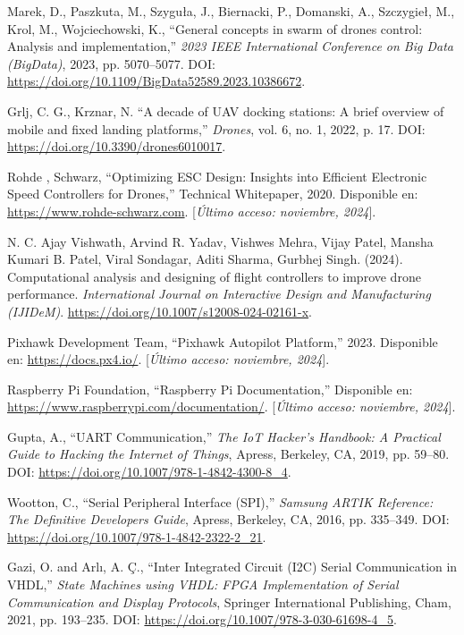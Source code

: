 \begin{thebibliography}{30}
    Marek, D., Paszkuta, M., Szyguła, J., Biernacki, P., Domanski, A., Szczygieł, M., Krol, M., Wojciechowski, K., ``General concepts in swarm of drones control: Analysis and implementation,'' \textit{2023 IEEE International Conference on Big Data (BigData)}, 2023, pp. 5070--5077. DOI: \url{https://doi.org/10.1109/BigData52589.2023.10386672}.



    Grlj, C. G., Krznar, N. ``A decade of UAV docking stations: A brief overview of mobile and fixed landing platforms,'' \textit{Drones}, vol. 6, no. 1, 2022, p. 17. DOI: \url{https://doi.org/10.3390/drones6010017}.

    

    Rohde , Schwarz, ``Optimizing ESC Design: Insights into Efficient Electronic Speed Controllers for Drones,'' Technical Whitepaper, 2020. Disponible en: \url{https://www.rohde-schwarz.com}. [\textit{Último acceso: noviembre, 2024}].

    N. C. Ajay Vishwath, Arvind R. Yadav, Vishwes Mehra, Vijay Patel, Mansha Kumari B. Patel, Viral Sondagar, Aditi Sharma, Gurbhej Singh. (2024). Computational analysis and designing of flight controllers to improve drone performance. \textit{International Journal on Interactive Design and Manufacturing (IJIDeM)}. \url{https://doi.org/10.1007/s12008-024-02161-x}.

    Pixhawk Development Team, ``Pixhawk Autopilot Platform,'' 2023. Disponible en: \url{https://docs.px4.io/}. [\textit{Último acceso: noviembre, 2024}].

    Raspberry Pi Foundation, ``Raspberry Pi Documentation,'' Disponible en: \url{https://www.raspberrypi.com/documentation/}. [\textit{Último acceso: noviembre, 2024}].

    Gupta, A., ``UART Communication,'' \textit{The IoT Hacker's Handbook: A Practical Guide to Hacking the Internet of Things}, Apress, Berkeley, CA, 2019, pp. 59--80. DOI: \url{https://doi.org/10.1007/978-1-4842-4300-8_4}.

    Wootton, C., ``Serial Peripheral Interface (SPI),'' \textit{Samsung ARTIK Reference: The Definitive Developers Guide}, Apress, Berkeley, CA, 2016, pp. 335--349. DOI: \url{https://doi.org/10.1007/978-1-4842-2322-2_21}.

    Gazi, O. and Arlı, A. Ç., ``Inter Integrated Circuit (I2C) Serial Communication in VHDL,'' \textit{State Machines using VHDL: FPGA Implementation of Serial Communication and Display Protocols}, Springer International Publishing, Cham, 2021, pp. 193--235. DOI: \url{https://doi.org/10.1007/978-3-030-61698-4_5}.


\end{thebibliography}
